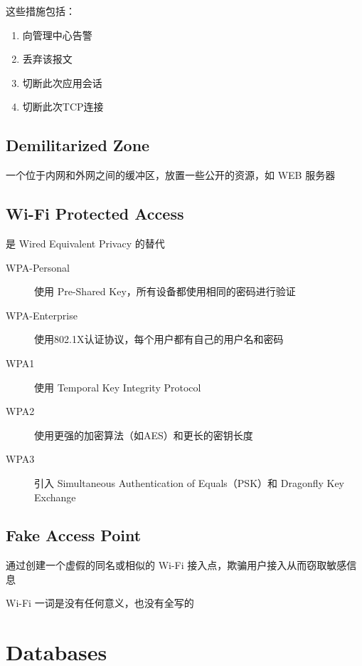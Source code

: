 \documentclass[11pt,journal,compsoc]{IEEEtran}
\begin{document}
这些措施包括：

\begin{enumerate}
    \item 向管理中心告警
    \item 丢弃该报文
    \item 切断此次应用会话
    \item 切断此次TCP连接
\end{enumerate}


\subsection{Demilitarized Zone}

一个位于内网和外网之间的缓冲区，放置一些公开的资源，如 WEB 服务器


\subsection{Wi-Fi Protected Access}

是 Wired Equivalent Privacy 的替代

\begin{description}
    \item[WPA-Personal] 使用 Pre-Shared Key，所有设备都使用相同的密码进行验证

    \item[WPA-Enterprise] 使用802.1X认证协议，每个用户都有自己的用户名和密码
\end{description}

\begin{description}
    \item[WPA1] 使用 Temporal Key Integrity Protocol

    \item[WPA2] 使用更强的加密算法（如AES）和更长的密钥长度

    \item[WPA3] 引入 Simultaneous Authentication of Equals（PSK）和 Dragonfly Key Exchange
\end{description}


\subsection{Fake Access Point}

通过创建一个虚假的同名或相似的 Wi-Fi 接入点，欺骗用户接入从而窃取敏感信息

Wi-Fi 一词是没有任何意义，也没有全写的


\section{Databases}
\end{document}
